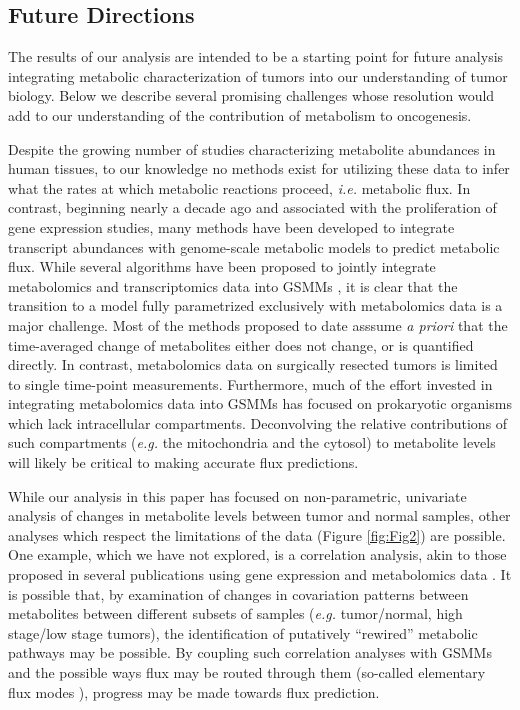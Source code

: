 \documentclass[10pt]{article}
\begin{document}
\subsection{Future Directions}
The results of our analysis are intended to be a starting point for future analysis integrating metabolic characterization of tumors into our understanding of tumor biology. Below we describe several promising challenges whose resolution would add to our understanding of the contribution of metabolism to oncogenesis.

Despite the growing number of studies characterizing metabolite abundances in human tissues, to our knowledge no methods exist for utilizing these data to infer what the rates at which metabolic reactions proceed, \textit{i.e.} metabolic flux. In contrast, beginning nearly a decade ago and associated with the proliferation of gene expression studies, many methods have been developed to integrate transcript abundances with genome-scale metabolic models to predict metabolic flux. While several algorithms have been proposed to jointly integrate metabolomics and transcriptomics data into GSMMs \cite{Reznik2013,ShlomiPaper}, it is clear that the transition to a model fully parametrized exclusively with metabolomics data is a major challenge. Most of the methods proposed to date asssume \textit{a priori} that the time-averaged change of metabolites either does not change, or is quantified directly. In contrast, metabolomics data on surgically resected tumors is limited to single time-point measurements. Furthermore, much of the effort invested in integrating metabolomics data into GSMMs has focused on prokaryotic organisms which lack intracellular compartments. Deconvolving the relative contributions of such compartments (\textit{e.g.} the mitochondria and the cytosol) to metabolite levels will likely be critical to making accurate flux predictions.

While our analysis in this paper has focused on non-parametric, univariate analysis of changes in metabolite levels between tumor and normal samples, other analyses which respect the limitations of the data (Figure \ref{fig:Fig2}) are possible. One example, which we have not explored, is a correlation analysis, akin to those proposed in several publications using gene expression and metabolomics data \cite{Reznik2015,etc}. It is possible that, by examination of changes in covariation patterns between metabolites between different subsets of samples (\textit{e.g.} tumor/normal, high stage/low stage tumors), the identification of putatively ``rewired'' metabolic pathways may be possible. By coupling such correlation analyses with GSMMs and the possible ways flux may be routed through them (so-called elementary flux modes \cite{EFMs}), progress may be made towards flux prediction.
\end{document}
